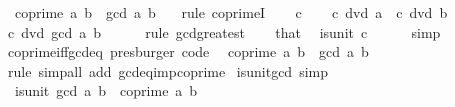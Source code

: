 \begin{isabellebody}
\ \ {\isachardoublequoteopen}coprime\ a\ b{\isachardoublequoteclose}\ \ {\isachardoublequoteopen}gcd\ a\ b\ {\isacharequal}{\kern0pt}\ {}{\isachardoublequoteclose}\isanewline
%
\isadelimproof
%
\endisadelimproof
%
\isatagproof
{}\isamarkupfalse%
\ {\isacharparenleft}{\kern0pt}rule\ coprimeI{\isacharparenright}{\kern0pt}\isanewline
\ \ \isamarkupfalse%
\ c\isanewline
\ \ \isamarkupfalse%
\ {\isachardoublequoteopen}c\ dvd\ a{\isachardoublequoteclose}\ \ {\isachardoublequoteopen}c\ dvd\ b{\isachardoublequoteclose}\isanewline
\ \ \isamarkupfalse%
\ \isamarkupfalse%
\ {\isachardoublequoteopen}c\ dvd\ gcd\ a\ b{\isachardoublequoteclose}\isanewline
\ \ \ \ \isamarkupfalse%
\ {\isacharparenleft}{\kern0pt}rule\ gcd{\isacharunderscore}{\kern0pt}greatest{\isacharparenright}{\kern0pt}\isanewline
\ \ \isamarkupfalse%
\ that\ \isamarkupfalse%
\ {\isachardoublequoteopen}is{\isacharunderscore}{\kern0pt}unit\ c{\isachardoublequoteclose}\isanewline
\ \ \ \ \isamarkupfalse%
\ simp\isanewline
{}\isamarkupfalse%
%
\endisatagproof
{\isafoldproof}%
%
\isadelimproof
\isanewline
%
\endisadelimproof
\isanewline
{}\isamarkupfalse%
\ coprime{\isacharunderscore}{\kern0pt}iff{\isacharunderscore}{\kern0pt}gcd{\isacharunderscore}{\kern0pt}eq{\isacharunderscore}{\kern0pt}{}\ {\isacharbrackleft}{\kern0pt}presburger{\isacharcomma}{\kern0pt}\ code{\isacharbrackright}{\kern0pt}{\isacharcolon}{\kern0pt}\isanewline
\ \ {\isachardoublequoteopen}coprime\ a\ b\ {\isasymlongleftrightarrow}\ gcd\ a\ b\ {\isacharequal}{\kern0pt}\ {}{\isachardoublequoteclose}\isanewline
%
\isadelimproof
\ \ %
\endisadelimproof
%
\isatagproof
{}\isamarkupfalse%
\ rule\ {\isacharparenleft}{\kern0pt}simp{\isacharunderscore}{\kern0pt}all\ add{\isacharcolon}{\kern0pt}\ gcd{\isacharunderscore}{\kern0pt}eq{\isacharunderscore}{\kern0pt}{}{\isacharunderscore}{\kern0pt}imp{\isacharunderscore}{\kern0pt}coprime{\isacharparenright}{\kern0pt}%
\endisatagproof
{\isafoldproof}%
%
\isadelimproof
\isanewline
%
\endisadelimproof
\isanewline
{}\isamarkupfalse%
\ is{\isacharunderscore}{\kern0pt}unit{\isacharunderscore}{\kern0pt}gcd\ {\isacharbrackleft}{\kern0pt}simp{\isacharbrackright}{\kern0pt}{\isacharcolon}{\kern0pt}\isanewline
\ \ {\isachardoublequoteopen}is{\isacharunderscore}{\kern0pt}unit\ {\isacharparenleft}{\kern0pt}gcd\ a\ b{\isacharparenright}{\kern0pt}\ {\isasymlongleftrightarrow}\ coprime\ a\ b{\isachardoublequoteclose}\isanewline

\end{isabellebody}

